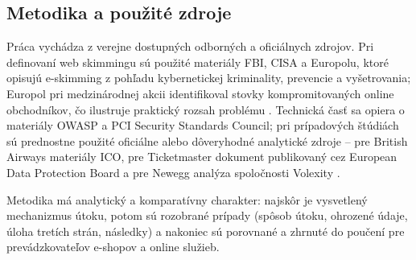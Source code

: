 \subsection{Metodika a použité zdroje}

Práca vychádza z verejne dostupných odborných a oficiálnych zdrojov. Pri definovaní web skimmingu sú použité materiály FBI, CISA a Europolu, ktoré opisujú e-skimming z pohľadu kybernetickej kriminality, prevencie a vyšetrovania; Europol pri medzinárodnej akcii identifikoval stovky kompromitovaných online obchodníkov, čo ilustruje praktický rozsah problému \cite{fbi2019eskimming,cisa2020eskimming,europolDigitalSkimming,europol2023action}. Technická časť sa opiera o materiály OWASP a PCI Security Standards Council; pri prípadových štúdiách sú prednostne použité oficiálne alebo dôveryhodné analytické zdroje -- pre British Airways materiály ICO, pre Ticketmaster dokument publikovaný cez European Data Protection Board a pre Newegg analýza spoločnosti Volexity \cite{owaspThirdPartyJavascript,owaspClientSideTop10,pciSsc2025PaymentPage,edpb2019BritishAirways,gdprRegister2020BritishAirways,ico2020Ticketmaster,volexity2018Newegg}.

Metodika má analytický a komparatívny charakter: najskôr je vysvetlený mechanizmus útoku, potom sú rozobrané prípady (spôsob útoku, ohrozené údaje, úloha tretích strán, následky) a nakoniec sú porovnané a zhrnuté do poučení pre prevádzkovateľov e-shopov a online služieb.
